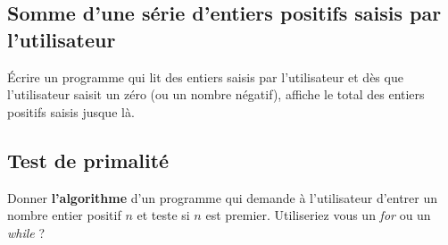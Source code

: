 \subsection{Somme d'une série d'entiers positifs saisis par
  l'utilisateur}
Écrire un programme  qui lit des entiers saisis par
l'utilisateur et dès que l'utilisateur saisit un zéro (ou un nombre négatif), affiche le total des entiers positifs saisis jusque là.


\subsection{Test de primalité}

Donner \textbf{l'algorithme} d'un programme qui demande à l'utilisateur d'entrer un
nombre entier positif $n$ et teste si $n$ est premier. Utiliseriez
vous un \emph{for} ou un \emph{while} ?


